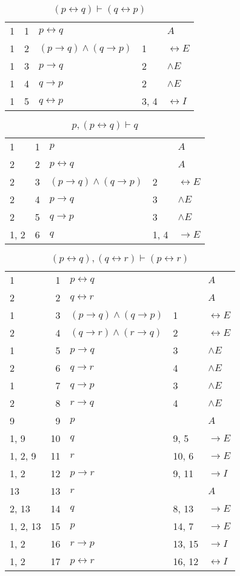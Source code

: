 \documentclass{article}
\begin{document}
\begin{table}[htbp]\caption*{$(p↔q) ⊢ (q↔p)$}\centering\begin{tabular}{lrlll}
{1} & 1 & $p↔q$ & {} & $A$ \\
{1} & 2 & $(p→q)∧(q→p)$ & {1} & $↔E$ \\
{1} & 3 & $p→q$ & {2} & $∧E$ \\
{1} & 4 & $q→p$ & {2} & $∧E$ \\
{1} & 5 & $q↔p$ & {3, 4} & $↔I$ \\
\end{tabular}
\end{table}
\begin{table}[htbp]\caption*{$p,(p↔q) ⊢ q$}\centering\begin{tabular}{lrlll}
{1} & 1 & $p$ & {} & $A$ \\
{2} & 2 & $p↔q$ & {} & $A$ \\
{2} & 3 & $(p→q)∧(q→p)$ & {2} & $↔E$ \\
{2} & 4 & $p→q$ & {3} & $∧E$ \\
{2} & 5 & $q→p$ & {3} & $∧E$ \\
{1, 2} & 6 & $q$ & {1, 4} & $→E$ \\
\end{tabular}
\end{table}
\begin{table}[htbp]\caption*{$(p↔q),(q↔r) ⊢ (p↔r)$}\centering\begin{tabular}{lrlll}
{1} & 1 & $p↔q$ & {} & $A$ \\
{2} & 2 & $q↔r$ & {} & $A$ \\
{1} & 3 & $(p→q)∧(q→p)$ & {1} & $↔E$ \\
{2} & 4 & $(q→r)∧(r→q)$ & {2} & $↔E$ \\
{1} & 5 & $p→q$ & {3} & $∧E$ \\
{2} & 6 & $q→r$ & {4} & $∧E$ \\
{1} & 7 & $q→p$ & {3} & $∧E$ \\
{2} & 8 & $r→q$ & {4} & $∧E$ \\
{9} & 9 & $p$ & {} & $A$ \\
{1, 9} & 10 & $q$ & {9, 5} & $→E$ \\
{1, 2, 9} & 11 & $r$ & {10, 6} & $→E$ \\
{1, 2} & 12 & $p→r$ & {9, 11} & $→I$ \\
{13} & 13 & $r$ & {} & $A$ \\
{2, 13} & 14 & $q$ & {8, 13} & $→E$ \\
{1, 2, 13} & 15 & $p$ & {14, 7} & $→E$ \\
{1, 2} & 16 & $r→p$ & {13, 15} & $→I$ \\
{1, 2} & 17 & $p↔r$ & {16, 12} & $↔I$ \\
\end{tabular}
\end{table}
\end{document}
